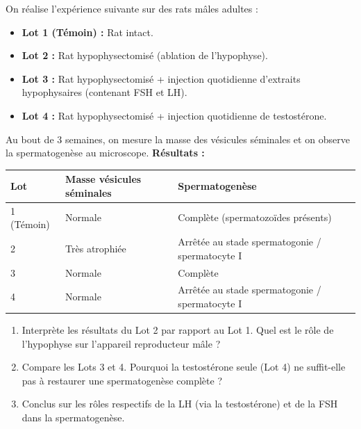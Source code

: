 \documentclass[11pt]{article}
\begin{document}
\begin{exercice}
On réalise l'expérience suivante sur des rats mâles adultes :
\begin{itemize}
    \item \textbf{Lot 1 (Témoin) :} Rat intact.
    \item \textbf{Lot 2 :} Rat hypophysectomisé (ablation de l'hypophyse).
    \item \textbf{Lot 3 :} Rat hypophysectomisé + injection quotidienne d'extraits hypophysaires (contenant FSH et LH).
    \item \textbf{Lot 4 :} Rat hypophysectomisé + injection quotidienne de testostérone.
\end{itemize}
Au bout de 3 semaines, on mesure la masse des vésicules séminales et on observe la spermatogenèse au microscope.
\textbf{Résultats :}
\begin{center}
\begin{tabularx}{\linewidth}{|l|X|X|}\hline
\textbf{Lot} & \textbf{Masse vésicules séminales} & \textbf{Spermatogenèse} \\ \hline
1 (Témoin) & Normale & Complète (spermatozoïdes présents) \\ \hline
2 & Très atrophiée & Arrêtée au stade spermatogonie / spermatocyte I \\ \hline
3 & Normale & Complète \\ \hline
4 & Normale & Arrêtée au stade spermatogonie / spermatocyte I \\ \hline
\end{tabularx}
\end{center}
\begin{enumerate}
    \item Interprète les résultats du Lot 2 par rapport au Lot 1. Quel est le rôle de l'hypophyse sur l'appareil reproducteur mâle ?
    \item Compare les Lots 3 et 4. Pourquoi la testostérone seule (Lot 4) ne suffit-elle pas à restaurer une spermatogenèse complète ?
    \item Conclus sur les rôles respectifs de la LH (via la testostérone) et de la FSH dans la spermatogenèse.
\end{enumerate}
\end{exercice}
\end{document}
